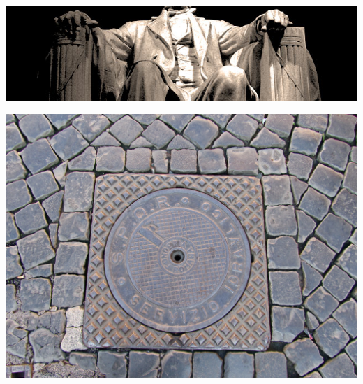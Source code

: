 \begin{frame}
    \centering
    \includegraphics[width=.9\textwidth]{img/fasces/lincoln_fasces.jpg} \\
\end{frame}

\begin{frame}
    \centering
    \includegraphics[width=.9\textwidth]{img/fasces/manhole.JPG} \\
\end{frame}

